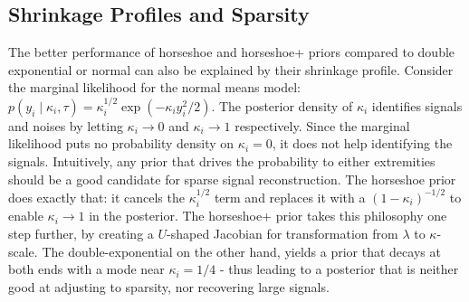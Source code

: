 \documentclass[11pt]{article}
\begin{document}
%

\subsection{Shrinkage Profiles and Sparsity}

The better performance of horseshoe and horseshoe+ priors compared to double exponential or normal can also be explained by their shrinkage profile. Consider the marginal likelihood for the normal means model: $p(y_i \mid \kappa_i, \tau) = \kappa_i^{1/2} \exp \left(-\kappa_i y_i^2/2 \right)$. The posterior density of $\kappa_i$ identifies signals and noises by letting $\kappa_i \to 0$ and $\kappa_i \to 1$ respectively. Since the marginal likelihood puts no probability density on $\kappa_i = 0$, it does not help identifying the signals. Intuitively, any prior that drives the probability to either extremities should be a good candidate for sparse signal reconstruction. The horseshoe prior does exactly that: it cancels the $\kappa_i^{1/2}$ term and replaces it with a $(1-\kappa_i)^{-1/2}$ to enable $\kappa_i \to 1$ in the posterior. The horseshoe+ prior takes this philosophy one step further, by creating a $U$-shaped Jacobian for transformation from $\lambda$ to $\kappa$-scale. The double-exponential on the other hand, yields a prior that decays at both ends with a mode near $\kappa_i = 1/4$ - thus leading to a posterior that is neither good at adjusting to sparsity, nor recovering large signals. 
\end{document}
